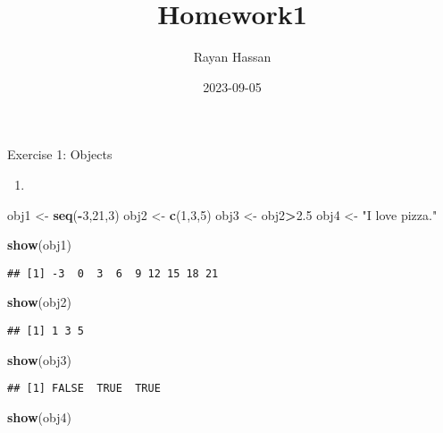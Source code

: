 \documentclass[
]{article}
\title{Homework1}
\author{Rayan Hassan}
\date{2023-09-05}
\newenvironment{Shaded}{\begin{snugshade}}{\end{snugshade}}
\newcommand{\DecValTok}[1]{\textcolor[rgb]{0.00,0.00,0.81}{#1}}
\newcommand{\FloatTok}[1]{\textcolor[rgb]{0.00,0.00,0.81}{#1}}
\newcommand{\FunctionTok}[1]{\textcolor[rgb]{0.13,0.29,0.53}{\textbf{#1}}}
\newcommand{\NormalTok}[1]{#1}
\newcommand{\OtherTok}[1]{\textcolor[rgb]{0.56,0.35,0.01}{#1}}
\newcommand{\SpecialCharTok}[1]{\textcolor[rgb]{0.81,0.36,0.00}{\textbf{#1}}}
\newcommand{\StringTok}[1]{\textcolor[rgb]{0.31,0.60,0.02}{#1}}
\providecommand{\tightlist}{%
  \setlength{\itemsep}{0pt}\setlength{\parskip}{0pt}}
\begin{document}
\maketitle

Exercise 1: Objects

\begin{enumerate}
\def\labelenumi{\arabic{enumi})}
\tightlist
\item
\end{enumerate}

\begin{Shaded}
\begin{Highlighting}[]
\NormalTok{obj1 }\OtherTok{\textless{}{-}} \FunctionTok{seq}\NormalTok{(}\SpecialCharTok{{-}}\DecValTok{3}\NormalTok{,}\DecValTok{21}\NormalTok{,}\DecValTok{3}\NormalTok{)}
\NormalTok{obj2 }\OtherTok{\textless{}{-}} \FunctionTok{c}\NormalTok{(}\DecValTok{1}\NormalTok{,}\DecValTok{3}\NormalTok{,}\DecValTok{5}\NormalTok{)}
\NormalTok{obj3 }\OtherTok{\textless{}{-}}\NormalTok{ obj2}\SpecialCharTok{\textgreater{}}\FloatTok{2.5}
\NormalTok{obj4 }\OtherTok{\textless{}{-}} \StringTok{"I love pizza."}

\FunctionTok{show}\NormalTok{(obj1)}
\end{Highlighting}
\end{Shaded}

\begin{verbatim}
## [1] -3  0  3  6  9 12 15 18 21
\end{verbatim}

\begin{Shaded}
\begin{Highlighting}[]
\FunctionTok{show}\NormalTok{(obj2)}
\end{Highlighting}
\end{Shaded}

\begin{verbatim}
## [1] 1 3 5
\end{verbatim}

\begin{Shaded}
\begin{Highlighting}[]
\FunctionTok{show}\NormalTok{(obj3)}
\end{Highlighting}
\end{Shaded}

\begin{verbatim}
## [1] FALSE  TRUE  TRUE
\end{verbatim}

\begin{Shaded}
\begin{Highlighting}[]
\FunctionTok{show}\NormalTok{(obj4)}
\end{Highlighting}
\end{Shaded}
\end{document}
